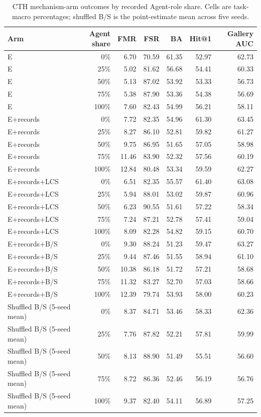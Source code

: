 \documentclass[10pt]{article}
\begin{document}
\begin{table}[ht]
\centering\scriptsize
\setlength{\tabcolsep}{3pt}
\caption{CTH mechanism-arm outcomes by recorded Agent-role share. Cells are task-macro percentages; shuffled B/S is the point-estimate mean across five seeds.}
\label{tab:mechanism-shares}
\begin{tabular}{@{}lrrrrrr@{}}
\toprule Arm & Agent share & FMR & FSR & BA & Hit@1 & Gallery AUC \\
\midrule
E & 0\% & 6.70 & 70.59 & 61.35 & 52.97 & 62.73 \\
E & 25\% & 5.02 & 81.62 & 56.68 & 54.41 & 60.33 \\
E & 50\% & 5.13 & 87.02 & 53.92 & 53.33 & 56.73 \\
E & 75\% & 5.38 & 87.90 & 53.36 & 54.38 & 56.69 \\
E & 100\% & 7.60 & 82.43 & 54.99 & 56.21 & 58.11 \\
\midrule
E+records & 0\% & 7.72 & 82.35 & 54.96 & 61.30 & 63.45 \\
E+records & 25\% & 8.27 & 86.10 & 52.81 & 59.82 & 61.27 \\
E+records & 50\% & 9.75 & 86.95 & 51.65 & 57.05 & 58.98 \\
E+records & 75\% & 11.46 & 83.90 & 52.32 & 57.56 & 60.19 \\
E+records & 100\% & 12.84 & 80.48 & 53.34 & 59.59 & 62.27 \\
\midrule
E+records+LCS & 0\% & 6.51 & 82.35 & 55.57 & 61.40 & 63.08 \\
E+records+LCS & 25\% & 5.94 & 88.01 & 53.02 & 59.87 & 60.96 \\
E+records+LCS & 50\% & 6.23 & 90.55 & 51.61 & 57.22 & 58.34 \\
E+records+LCS & 75\% & 7.24 & 87.21 & 52.78 & 57.41 & 59.04 \\
E+records+LCS & 100\% & 8.09 & 82.28 & 54.82 & 59.15 & 60.70 \\
\midrule
E+records+B/S & 0\% & 9.30 & 88.24 & 51.23 & 59.47 & 63.27 \\
E+records+B/S & 25\% & 9.44 & 87.46 & 51.55 & 58.94 & 61.10 \\
E+records+B/S & 50\% & 10.38 & 86.18 & 51.72 & 57.21 & 58.68 \\
E+records+B/S & 75\% & 11.32 & 83.27 & 52.70 & 57.03 & 58.66 \\
E+records+B/S & 100\% & 12.39 & 79.74 & 53.93 & 58.00 & 60.23 \\
\midrule
Shuffled B/S (5-seed mean) & 0\% & 8.37 & 84.71 & 53.46 & 58.33 & 62.36 \\
Shuffled B/S (5-seed mean) & 25\% & 7.76 & 87.82 & 52.21 & 57.81 & 59.99 \\
Shuffled B/S (5-seed mean) & 50\% & 8.13 & 88.90 & 51.49 & 55.51 & 56.60 \\
Shuffled B/S (5-seed mean) & 75\% & 8.72 & 86.36 & 52.46 & 56.19 & 56.76 \\
Shuffled B/S (5-seed mean) & 100\% & 9.37 & 82.40 & 54.11 & 56.89 & 57.25 \\
\bottomrule
\end{tabular}
\end{table}
\end{document}
